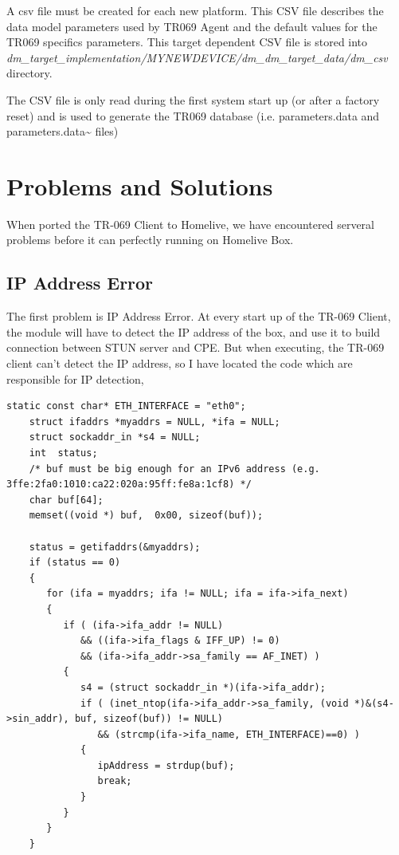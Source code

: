 A csv file must be created for each new platform. This CSV file describes the data model parameters used by TR069 Agent and the default values for the TR069 specifics parameters. This target dependent CSV file is stored into \\\textit{dm\_target\_implementation/MYNEWDEVICE/dm\_dm\_target\_data/dm\_csv} directory.

The CSV file is only read during the first system start up (or after a factory reset) and is used to generate the TR069
database (i.e. parameters.data and parameters.data\~{} files)


\section{Problems and Solutions}

When ported the TR-069 Client to Homelive, we have encountered serveral problems before it can perfectly running on Homelive Box.


\subsection{IP Address Error}
The first problem is IP Address Error. At every start up of the TR-069 Client, the module will have to detect the IP address of the box, and use it to build connection between STUN server and CPE. But when executing, the TR-069 client can't detect the IP address, so I have located the code which are responsible for IP detection,

\begin{lstlisting}[mathescape]
    static const char* ETH_INTERFACE = "eth0";
    struct ifaddrs *myaddrs = NULL, *ifa = NULL;
    struct sockaddr_in *s4 = NULL;
    int  status;
    /* buf must be big enough for an IPv6 address (e.g. 3ffe:2fa0:1010:ca22:020a:95ff:fe8a:1cf8) */
    char buf[64];
    memset((void *) buf,  0x00, sizeof(buf));

    status = getifaddrs(&myaddrs);
    if (status == 0)
    {
       for (ifa = myaddrs; ifa != NULL; ifa = ifa->ifa_next)
       {
          if ( (ifa->ifa_addr != NULL)
             && ((ifa->ifa_flags & IFF_UP) != 0)
             && (ifa->ifa_addr->sa_family == AF_INET) )
          {
             s4 = (struct sockaddr_in *)(ifa->ifa_addr);
             if ( (inet_ntop(ifa->ifa_addr->sa_family, (void *)&(s4->sin_addr), buf, sizeof(buf)) != NULL)
                && (strcmp(ifa->ifa_name, ETH_INTERFACE)==0) )
             {
                ipAddress = strdup(buf);
                break;
             }
          }
       }
    }
\end{lstlisting}

